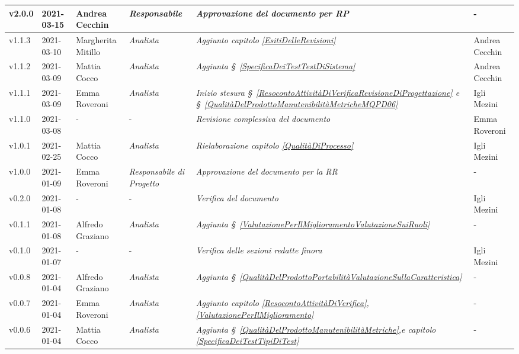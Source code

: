 {\begin{center}
\begin{longtable}[c]{|p{2cm-1\tabcolsep}|p{2cm}|p{}|p{}|p{}|p{4cm-2\tabcolsep}|}
		\hline
		\centering v2.0.0 & 2021-03-15 & Andrea Cecchin & \centering\textit{Responsabile}  &  \textit{Approvazione del documento per RP} & - \\
		\hline
		\centering v1.1.3 & 2021-03-10 & Margherita Mitillo  & \centering \textit{Analista}   &  \textit{Aggiunto capitolo \ref{EsitiDelleRevisioni} } & Andrea Cecchin\\
		\hline
		\centering v1.1.2 & 2021-03-09 & Mattia Cocco & \centering \textit{Analista}  &  \textit{Aggiunta \S~\ref{SpecificaDeiTestTestDiSistema} } & Andrea Cecchin \\
		\hline
		\centering v1.1.1 & 2021-03-09 & Emma Roveroni & \centering \textit{Analista} &  \textit{Inizio stesura \S~\ref{ResocontoAttivitàDiVerificaRevisioneDiProgettazione} e \S~\ref{QualitàDelProdottoManutenibilitàMetricheMQPD06}} & Igli Mezini  \\
		\hline
		\centering v1.1.0 & 2021-03-08 & \centering - & \centering - &  \textit{Revisione complessiva del documento} & Emma Roveroni  \\
		\hline
		\centering v1.0.1 & 2021-02-25 & Mattia Cocco  & \centering \textit{Analista}  &  \textit{Rielaborazione capitolo \ref{QualitàDiProcesso}}  & Igli Mezini \\
		\hline
		\centering v1.0.0  &  2021-01-09 & Emma Roveroni & \centering \textit{Responsabile di Progetto}  & \textit{Approvazione del documento per la RR} & -\\
		\hline
		\centering v0.2.0 & 2021-01-08 & \centering - & \centering - & \textit{Verifica del documento} & Igli Mezini  \\
		\hline
		\centering v0.1.1 & 2021-01-08 & Alfredo Graziano & \centering \textit{Analista}  & \textit{Aggiunta \S~\ref{ValutazionePerIlMiglioramentoValutazioneSuiRuoli}} & - \\
		\hline
		\centering v0.1.0 & 2021-01-07 & \centering - & \centering -  & \textit{Verifica delle sezioni redatte finora} & Igli Mezini \\
		\hline
		\centering v0.0.8 & 2021-01-04 & Alfredo Graziano  & \centering \textit{Analista}  & \textit{Aggiunta  \S~\ref{QualitàDelProdottoPortabilitàValutazioneSullaCaratteristica}}  &  - \\
		\hline
		\centering v0.0.7 & 2021-01-04 &  Emma Roveroni & \centering \textit{Analista} & \textit{Aggiunto capitolo \ref{ResocontoAttivitàDiVerifica}, \ref{ValutazionePerIlMiglioramento} } &  - \\
		\hline
		\centering v0.0.6 & 2021-01-04 & Mattia Cocco  & \centering \textit{Analista}   &  \textit{Aggiunta \S~\ref{QualitàDelProdottoManutenibilitàMetriche},e capitolo \ref{SpecificaDeiTestTipiDiTest} } &  - \\

\end{longtable}
\end{center}}
